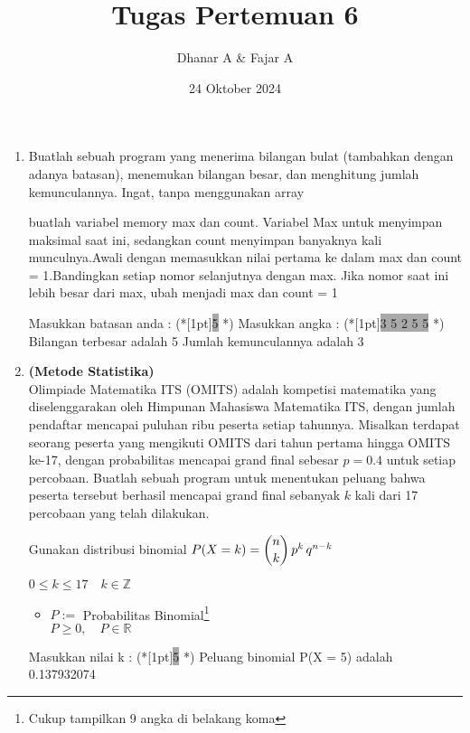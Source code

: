 \documentclass{article}
\title{\textbf{Tugas Pertemuan 6}}
\date{24 Oktober 2024}
\author{Dhanar A \& Fajar A}
\newcommand{\enter}{\raisebox{-1.8pt}{\begin{tikzpicture}[scale=0.3]
    \draw[thin,fill=lightgray] (0,0) rectangle (2,1);
    \draw (0.3,0.3) -- (0.7,0.3)--(0.7,0.6);     
\end{tikzpicture}}}
\newcommand{\inputscan}[1]{\raisebox{0pt}[1pt]{\colorbox{darkgray}{#1}}}
\newcommand{\R}{\mathbb{R}}
\newcommand{\Z}{\mathbb{Z}}
\begin{document}
\maketitle

\begin{enumerate}
    \item Buatlah sebuah program yang menerima bilangan bulat (tambahkan dengan adanya batasan), menemukan bilangan besar, dan menghitung jumlah kemunculannya. Ingat, tanpa menggunakan array 

    \begin{hint}
            buatlah variabel memory max dan count. Variabel Max untuk menyimpan maksimal saat ini, sedangkan count menyimpan banyaknya kali munculnya.Awali dengan memasukkan nilai pertama ke dalam max dan count = 1.Bandingkan setiap nomor selanjutnya dengan max. Jika nomor saat ini lebih besar dari max, ubah menjadi max dan count = 1
    \end{hint}

    \begin{RunCode}
Masukkan batasan anda : (*\inputscan{5} \enter*)
Masukkan angka : (*\inputscan{3 5 2 5 5} \enter*)
Bilangan terbesar adalah 5
Jumlah kemunculannya adalah 3
    \end{RunCode}


    \newpage
    \item \textbf{(Metode Statistika)}\\
    Olimpiade Matematika ITS (OMITS) adalah kompetisi matematika yang diselenggarakan oleh Himpunan Mahasiswa Matematika ITS, dengan jumlah pendaftar mencapai puluhan ribu peserta setiap tahunnya. Misalkan terdapat seorang peserta yang mengikuti OMITS dari tahun pertama hingga OMITS ke-17, dengan probabilitas mencapai grand final sebesar $ p= 0.4$ untuk setiap percobaan. Buatlah sebuah program untuk menentukan peluang bahwa peserta tersebut berhasil mencapai grand final sebanyak $k$ kali dari 17 percobaan yang telah dilakukan.

    \begin{hint}
        Gunakan distribusi binomial $P(X = k) = \dbinom{n}{k} \, p ^k \, q^{n-k}$  
    \end{hint}

    \begin{req}
        $0 \leq k \leq 17 \quad k \in \Z$
    \end{req}

    \begin{out}
        \begin{itemize}
                \item $P:=$ Probabilitas Binomial\footnote{Cukup tampilkan 9 angka di belakang koma}\\
                $P\geq 0,\quad P\in\R$
            \end{itemize}
    \end{out}

    \begin{RunCode}
Masukkan nilai k : (*\inputscan{5} \enter*)
Peluang binomial P(X = 5) adalah 0.137932074
    \end{RunCode}

\end{enumerate}
\end{document}
